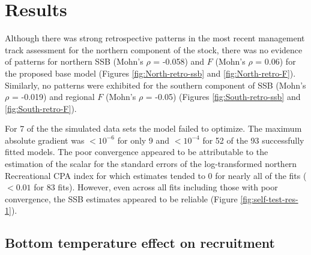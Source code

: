 \documentclass[
]{article}
\begin{document}
\hypertarget{results}{%
\section*{Results}\label{results}}

Although there was strong retrospective patterns in the most recent
management track assessment for the northern component of the stock,
there was no evidence of patterns for northern SSB (Mohn's \(\rho\) =
-0.058) and \(F\) (Mohn's \(\rho\) = 0.06) for the proposed base model
(Figures \ref{fig:North-retro-ssb} and \ref{fig:North-retro-F}).
Similarly, no patterns were exhibited for the southern component of SSB
(Mohn's \(\rho\) = -0.019) and regional \(F\) (Mohn's \(\rho\) = -0.05)
(Figures \ref{fig:South-retro-ssb} and \ref{fig:South-retro-F}).

For 7 of the the simulated data sets the model failed to optimize. The
maximum absolute gradient was \(<10^{-6}\) for only 9 and \(<10^{-4}\)
for 52 of the 93 successfully fitted models. The poor convergence
appeared to be attributable to the estimation of the scalar for the
standard errors of the log-transformed northern Recreational CPA index
for which estimates tended to 0 for nearly all of the fits (\(<0.01\)
for 83 fits). However, even across all fits including those with poor
convergence, the SSB estimates appeared to be reliable (Figure
\ref{fig:self-test-res-1}).

\hypertarget{bottom-temperature-effect-on-recruitment}{%
\subsection*{Bottom temperature effect on
recruitment}\label{bottom-temperature-effect-on-recruitment}}
\end{document}
